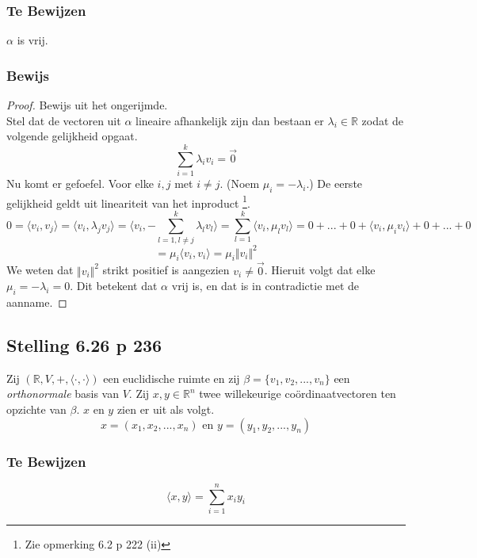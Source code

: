\documentclass[lineaire_algebra_oplossingen.tex]{subfiles}
\begin{document}
\subsubsection*{Te Bewijzen}
$\alpha$ is vrij.

\subsubsection*{Bewijs}
\begin{proof}
Bewijs uit het ongerijmde.\\
Stel dat de vectoren uit $\alpha$ lineaire afhankelijk zijn dan bestaan er $\lambda_i \in \mathbb{R}$ zodat de volgende gelijkheid opgaat.
\[
\sum_{i=1}^k \lambda_iv_i = \vec{0}
\]
Nu komt er gefoefel. Voor elke $i, j$ met $i\neq j$. (Noem $\mu_i =-\lambda_i $.)
De eerste gelijkheid geldt uit lineariteit van het inproduct \footnote{Zie opmerking 6.2 p 222 (ii)}.
\[
0 = \langle v_i, v_j \rangle = \langle v_i, \lambda_jv_j \rangle = \langle v_i, -\sum_{l=1, l\neq j}^k \lambda_lv_l \rangle = \sum_{l= 1}^k\langle v_i, \mu_lv_l\rangle = 0 + ... + 0 + \langle v_i,\mu_i v_i\rangle + 0 + ... + 0
\]
\[
= \mu_i \langle v_i,v_i\rangle = \mu_i \Vert v_i\Vert^2
\]
We weten dat $\Vert v_i\Vert^2$ strikt positief is aangezien $v_i \neq \vec{0}$. Hieruit volgt dat elke $\mu_i = -\lambda_i = 0$. Dit betekent dat $\alpha$ vrij is, en dat is in contradictie met de aanname.
\end{proof}


\subsection{Stelling 6.26 p 236}
\label{6.26}
Zij $(\mathbb{R}, V,+, \langle \cdot,\cdot \rangle)$ een euclidische ruimte en zij $\beta = \{v_1,v_2,...,v_n\}$ een \emph{orthonormale} basis van $V$. Zij $x,y\in \mathbb{R}^n$ twee willekeurige co\"ordinaatvectoren ten opzichte van $\beta$. $x$ en $y$ zien er uit als volgt.
\[
x = (x_1,x_2,...,x_n) \text { en } y = (y_1,y_2,...,y_n)
\]

\subsubsection*{Te Bewijzen}
\[
\langle x,y\rangle = \sum_{i=1}^nx_iy_i
\]
\end{document}
